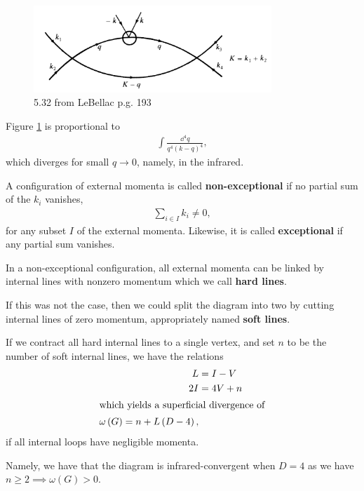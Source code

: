 \begin{figure}[h]
    \centering
    \includegraphics[width=0.8\textwidth]{figures/5.32.png}
    \caption{5.32 from LeBellac p.g. 193}
    \label{fig:5.32}
\end{figure}

Figure \ref{fig:5.32} is proportional to
\begin{align*}
    \int \frac{\dd{^{4}q}}{q^{4} \left( k - q \right)^{4}}
,\end{align*}
which diverges for small $q \to 0$, namely, in the infrared.

\begin{definition}
    A configuration of external momenta is called \textbf{non-exceptional} if no partial sum of the $k_i$ vanishes,
    \begin{align*}
        \sum_{i\in I}^{} k_i \neq 0 
    ,\end{align*}
    for any subset $I$ of the external momenta. Likewise, it is called \textbf{exceptional} if any partial sum vanishes.
\end{definition}

In a non-exceptional configuration, all external momenta can be linked by internal lines with nonzero momentum which we call \textbf{hard lines}. 

If this was not the case, then we could split the diagram into two by cutting internal lines of zero momentum, appropriately named \textbf{soft lines}.

If we contract all hard internal lines to a single vertex, and set $n$ to be the number of soft internal lines, we have the relations
\begin{align*}
    L &= I - V \\
    2I &= 4 V + n \\
    \intertext{which yields a superficial divergence of}
    \omega \left( G \right) = n + L \left( D - 4 \right) 
,\end{align*}
if all internal loops have negligible momenta.

Namely, we have that the diagram is infrared-convergent when $D = 4$ as we have $n \geq 2 \implies \omega \left( G \right) > 0$.

